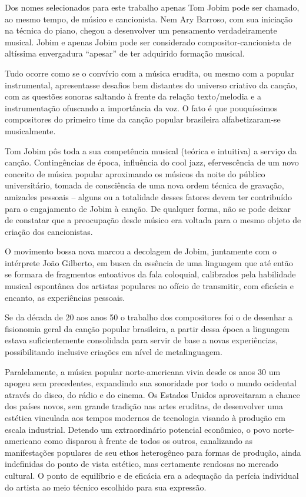 Dos nomes selecionados para este trabalho apenas Tom Jobim pode ser
chamado, ao mesmo tempo, de músico e cancionista. Nem Ary Barroso, com
sua iniciação na técnica do piano, chegou a desenvolver um pensamento
verdadeiramente musical. Jobim e apenas Jobim pode ser considerado
compositor-cancionista de altíssima envergadura ``apesar'' de ter
adquirido formação musical.~

Tudo ocorre como se o convívio com a música erudita, ou mesmo com a
popular instrumental, apresentasse desafios bem distantes do universo
criativo da canção, com as questões sonoras saltando à frente da relação
texto/melodia e a instrumentação ofuscando a importância da voz. O fato
é que pouquíssimos compositores do primeiro time da canção popular
brasileira alfabetizaram-se musicalmente.

Tom Jobim pôs toda a sua competência musical (teórica e intuitiva) a
serviço da canção. Contingências de época, influência do cool jazz,
efervescência de um novo conceito de música popular aproximando os
músicos da noite do público universitário, tomada de consciência de uma
nova ordem técnica de gravação, amizades pessoais -- alguns ou a
totalidade desses fatores devem ter contribuído para o engajamento de
Jobim à canção. De qualquer forma, não se pode deixar de constatar que a
preocupação desde músico era voltada para o mesmo objeto de criação dos
cancionistas.~

O movimento bossa nova marcou a decolagem de Jobim, juntamente com o
intérprete João Gilberto, em busca da essência de uma linguagem que até
então se formara de fragmentos entoativos da fala coloquial, calibrados
pela habilidade musical espontânea dos artistas populares no ofício de
transmitir, com eficácia e encanto, as experiências pessoais.

Se da década de 20 aos anos 50 o trabalho dos compositores foi o de
desenhar a fisionomia geral da canção popular brasileira, a partir dessa
época a linguagem estava suficientemente consolidada para servir de base
a novas experiências, possibilitando inclusive criações em nível de
metalinguagem.

Paralelamente, a música popular norte-americana vivia desde os anos 30
um apogeu sem precedentes, expandindo sua sonoridade por todo o mundo
ocidental através do disco, do rádio e do cinema. Os Estados Unidos
aproveitaram a chance dos países novos, sem grande tradição nas artes
eruditas, de desenvolver uma estética vinculada aos tempos modernos de
tecnologia visando à produção em escala industrial. Detendo um
extraordinário potencial econômico, o povo norte-americano como disparou
à frente de todos os outros, canalizando as manifestações populares de
seu ethos heterogêneo para formas de produção, ainda indefinidas do
ponto de vista estético, mas certamente rendosas no mercado cultural. O
ponto de equilíbrio e de eficácia era a adequação da perícia individual
do artista ao meio técnico escolhido para sua expressão.~

